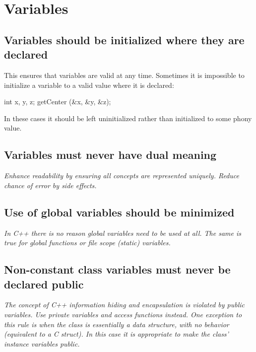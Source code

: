 \documentclass[a4paper,11pt,oneside]{scrbook}
\newcommand{\guideline}[1]{{\subsection{#1}}}
\newcommand{\motivation}[1]{{\normalfont \itshape #1}}
\begin{document}
\section{Variables}

\guideline{Variables should be initialized where they are declared}

This ensures that variables are valid at any time. Sometimes it is
impossible to initialize a variable to a valid value where it is
declared:

\begin{code}
  int x, y, z; 
  getCenter (&x, &y, &z); 
\end{code}

In these cases it should be left uninitialized rather than initialized to some phony value.

\guideline{Variables must never have dual meaning}

\motivation{
  Enhance readability by ensuring all concepts are represented
  uniquely. Reduce chance of error by side effects.
}

\guideline{Use of global variables should be minimized}

\motivation{
  In C++ there is no reason global variables need to be used at all. The
  same is true for global functions or file scope (static) variables.
}

\guideline{Non-constant class variables must never be declared public}

\motivation{
  The concept of C++ information hiding and encapsulation is violated by
  public variables. Use private variables and access functions
  instead. One exception to this rule is when the class is essentially a
  data structure, with no behavior (equivalent to a C struct). In this
  case it is appropriate to make the class' instance variables public.
}
\end{document}

